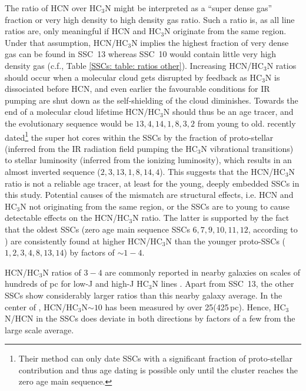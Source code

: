 The ratio of HCN over HC$_3$N might be interpreted as a ``super dense gas'' fraction or very high density to high density gas ratio. Such a ratio is, as all line ratios are, only meaningful if HCN and HC$_3$N originate from the same region. Under that assumption, HCN/HC$_3$N implies the highest fraction of very dense gas can be found in SSC~13 whereas SSC~10 would contain little very high density gas (c.f., Table \ref{SSCs: table: ratios other}).
Increasing HCN/HC$_3$N ratios should occur when a molecular cloud gets disrupted by feedback as HC$_3$N is dissociated before HCN, and even earlier the favourable conditions for IR pumping are shut down as the self-shielding of the cloud diminishes. Towards the end of a molecular cloud lifetime HCN/HC$_3$N should thus be an age tracer, and the evolutionary sequence would be $13,4,14,1,8,3,2$ from young to old. \citet{2020MNRAS.491.4573R} recently dated\footnote{Their method can only date SSCs with a significant fraction of proto-stellar contribution and thus age dating is possible only until the cluster reaches the zero age main sequence.} the super hot cores within the SSCs by the fraction of proto-stellar (inferred from the IR radiation field pumping the HC$_3$N vibrational transitions) to stellar luminosity (inferred from the ionizing luminosity), which results in an almost inverted sequence ($2,3,13,1,8,14,4$). This suggests that the HCN/HC$_3$N ratio is not a reliable age tracer, at least for the young, deeply embedded SSCs in this study. Potential causes of the mismatch are structural effects, i.e. HCN and HC$_3$N not originating from the same region, or the SSCs are to young to cause detectable effects on the HCN/HC$_3$N ratio. The latter is supported by the fact that the oldest SSCs (zero age main sequence SSCs $6,7,9,10,11,12$, according to \citealt{2020MNRAS.491.4573R}) are consistently found at higher HCN/HC$_3$N than the younger proto-SSCs ($1,2,3,4,8,13,14$) by factors of $\sim1-4$.

HCN/HC$_3$N ratios of $3-4$ are commonly reported in nearby galaxies on scales of hundreds of pc for low-J and high-J HC$_3$N lines \citep[NGC~4418, IC~342;][]{2005ApJ...618..259M,2007A&A...475..479A,2010ApJ...725L.228S,2011AJ....142...32M}. Apart from SSC~13, the other SSCs show considerably larger ratios than this nearby galaxy average.
In the center of , HCN/HC$_3$N$\sim10$ has been measured by \citet{Lindberg:2011kk} over 25\arcsec (425\,pc). Hence, HC$_3$N/HCN in the SSCs does deviate in both directions by factors of a few from the large scale average.

